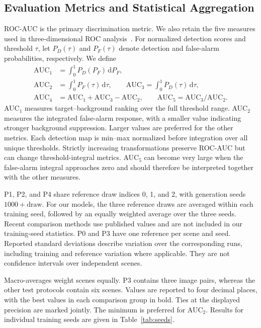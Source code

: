 \documentclass[a4paper,11pt]{article}
\begin{document}
\subsection{Evaluation Metrics and Statistical Aggregation}
ROC-AUC is the primary discrimination metric. We also retain the five measures used in three-dimensional ROC analysis~\cite{chang2021}. For normalized detection scores and threshold $\tau$, let $P_D(\tau)$ and $P_F(\tau)$ denote detection and false-alarm probabilities, respectively. We define
\begin{align}
\mathrm{AUC}_1&=\int_0^1P_D(P_F)\,\mathrm dP_F,\\
\mathrm{AUC}_2&=\int_0^1P_F(\tau)\,\mathrm d\tau,\qquad
\mathrm{AUC}_3=\int_0^1P_D(\tau)\,\mathrm d\tau,\\
\mathrm{AUC}_4&=\mathrm{AUC}_1+\mathrm{AUC}_3-\mathrm{AUC}_2,\qquad
\mathrm{AUC}_5=\mathrm{AUC}_3/\mathrm{AUC}_2.
\end{align}
AUC$_1$ measures target--background ranking over the full threshold range. AUC$_2$ measures the integrated false-alarm response, with a smaller value indicating stronger background suppression. Larger values are preferred for the other metrics. Each detection map is min--max normalized before integration over all unique thresholds. Strictly increasing transformations preserve ROC-AUC but can change threshold-integral metrics. AUC$_5$ can become very large when the false-alarm integral approaches zero and should therefore be interpreted together with the other measures.

P1, P2, and P4 share reference draw indices 0, 1, and 2, with generation seeds $1000+\mathrm{draw}$. For our models, the three reference draws are averaged within each training seed, followed by an equally weighted average over the three seeds. Recent comparison methods use published values and are not included in our training-seed statistics. P0 and P3 have one reference per scene and seed. Reported standard deviations describe variation over the corresponding runs, including training and reference variation where applicable. They are not confidence intervals over independent scenes.

Macro-averages weight scenes equally. P3 contains three image pairs, whereas the other test protocols contain six scenes. Values are reported to four decimal places, with the best values in each comparison group in bold. Ties at the displayed precision are marked jointly. The minimum is preferred for AUC$_2$. Results for individual training seeds are given in Table~\ref{tab:seeds}.
\end{document}
